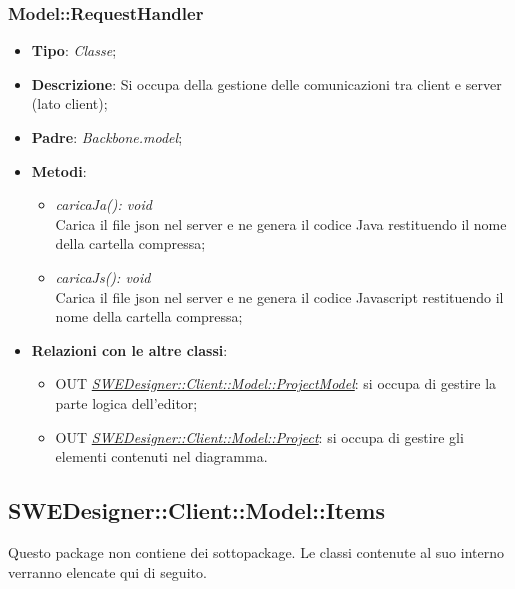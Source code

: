 \documentclass[../DefinizioneDiProdotto.tex]{subfiles}
\begin{document}
				\subsubsection{Model::RequestHandler}
				\hypertarget{SWEDesigner::Client::Model::RequestHandler}{}
					\begin{itemize}
						\item \textbf{Tipo}: \emph{Classe};
						\item \textbf{Descrizione}: Si occupa della gestione delle comunicazioni tra client e server (lato client);
						\item \textbf{Padre}: \emph{Backbone.model};
						\item \textbf{Metodi}:
						\begin{itemize}
							\item \emph{caricaJa(): void} \\
							Carica il file json nel server e ne genera il codice Java restituendo il nome della cartella compressa; \\
							\item \emph{caricaJs(): void} \\
							Carica il file json nel server e ne genera il codice Javascript restituendo il nome della cartella compressa; \\
						\end{itemize}
						\item \textbf{Relazioni con le altre classi}:
						\begin{itemize}
							\item OUT \hyperlink{SWEDesigner::Client::Model::ProjectModel}{\emph{SWEDesigner::Client::Model::ProjectModel}}: si occupa di gestire la parte logica dell'editor;
							\item OUT \hyperlink{SWEDesigner::Client::Model::Project}{\emph{SWEDesigner::Client::Model::Project}}: si occupa di gestire gli elementi contenuti nel diagramma.
						\end{itemize}
					\end{itemize}
		
			
			\subsection{SWEDesigner::Client::Model::Items}
			\hypertarget{SWEDesigner::Client::Model::Items}{}
			Questo package non contiene dei sottopackage. Le classi contenute al suo interno verranno
			elencate qui di seguito.
			
\end{document}
